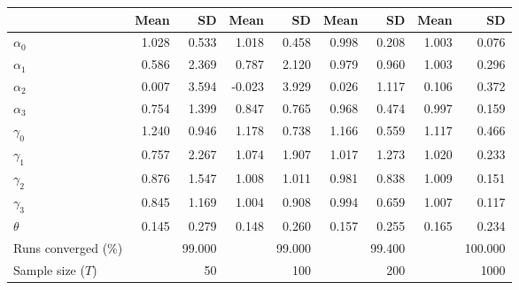 
\begin{tabular}[t]{lrrrrrrrr}
\toprule
  & Mean & SD & Mean  & SD  & Mean   & SD   & Mean    & SD   \\
\midrule
$\alpha_{0}$ & 1.028 & 0.533 & 1.018 & 0.458 & 0.998 & 0.208 & 1.003 & 0.076\\
$\alpha_{1}$ & 0.586 & 2.369 & 0.787 & 2.120 & 0.979 & 0.960 & 1.003 & 0.296\\
$\alpha_{2}$ & 0.007 & 3.594 & -0.023 & 3.929 & 0.026 & 1.117 & 0.106 & 0.372\\
$\alpha_{3}$ & 0.754 & 1.399 & 0.847 & 0.765 & 0.968 & 0.474 & 0.997 & 0.159\\
$\gamma_{0}$ & 1.240 & 0.946 & 1.178 & 0.738 & 1.166 & 0.559 & 1.117 & 0.466\\
$\gamma_{1}$ & 0.757 & 2.267 & 1.074 & 1.907 & 1.017 & 1.273 & 1.020 & 0.233\\
$\gamma_{2}$ & 0.876 & 1.547 & 1.008 & 1.011 & 0.981 & 0.838 & 1.009 & 0.151\\
$\gamma_{3}$ & 0.845 & 1.169 & 1.004 & 0.908 & 0.994 & 0.659 & 1.007 & 0.117\\
$\theta$ & 0.145 & 0.279 & 0.148 & 0.260 & 0.157 & 0.255 & 0.165 & 0.234\\
Runs converged (\%) &  & 99.000 &  & 99.000 &  & 99.400 &  & 100.000\\
Sample size ($T$) &  & 50 &  & 100 &  & 200 &  & 1000\\
\bottomrule
\end{tabular}
